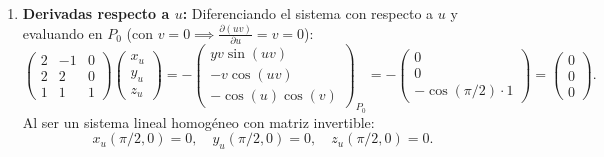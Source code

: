 \documentclass[11pt,a4paper]{article}
\begin{document}
\begin{enumerate}[label=\textbf{\arabic*.}]
\item \textbf{Derivadas respecto a $u$:}
Diferenciando el sistema con respecto a $u$ y evaluando en $P_0$ (con $v=0 \implies \frac{\partial(uv)}{\partial u} = v = 0$):
\begin{equation*}
\begin{pmatrix} 2 & -1 & 0 \\ 2 & 2 & 0 \\ 1 & 1 & 1 \end{pmatrix} \begin{pmatrix} x_u \\ y_u \\ z_u \end{pmatrix} = - \begin{pmatrix} y v \sin(uv) \\ -v\cos(uv) \\ -\cos(u)\cos(v) \end{pmatrix}_{P_0} = - \begin{pmatrix} 0 \\ 0 \\ -\cos(\pi/2)\cdot 1 \end{pmatrix} = \begin{pmatrix} 0 \\ 0 \\ 0 \end{pmatrix}.
\end{equation*}
Al ser un sistema lineal homogéneo con matriz invertible:
\begin{equation*}
x_u(\pi/2, 0) = 0, \quad y_u(\pi/2, 0) = 0, \quad z_u(\pi/2, 0) = 0.
\end{equation*}
\end{enumerate}
\end{document}
